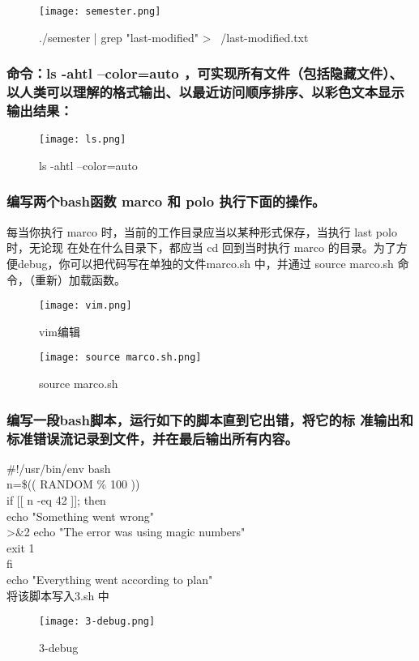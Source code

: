 \documentclass{ctexart}
\begin{document}
\begin{figure}[H]
    \centering
    \texttt{[image: semester.png]}
    \caption{./semester | grep "last-modified" > ~/last-modified.txt}
    \label{fig:enter-label}
\end{figure}


\subsubsection{ 命令：ls -ahtl --color=auto ，可实现所有文件（包括隐藏文件）、以人类可以理解的格式输出、以最近访问顺序排序、以彩色文本显示输出结果：}

\begin{figure}[H]
    \centering
    \texttt{[image: ls.png]}
    \caption{ls -ahtl --color=auto}
    \label{fig:enter-label}
\end{figure}

\subsubsection{编写两个bash函数 marco 和 polo 执行下面的操作。}
每当你执行 marco 时，当前的工作目录应当以某种形式保存，当执行 last polo 时，无论现
在处在什么目录下，都应当 cd 回到当时执行 marco 的目录。为了方便debug，你可以把代码写在单独的文件marco.sh 中，并通过 source marco.sh 命令，（重新）加载函数。
\begin{figure}[H]
    \centering
    \texttt{[image: vim.png]}
    \caption{vim编辑}
    \label{fig:enter-label}
\end{figure}

\begin{figure}[H]
    \centering
    \texttt{[image: source marco.sh.png]}
    \caption{source marco.sh}
    \label{fig:enter-label}
\end{figure}


\subsubsection{编写一段bash脚本，运行如下的脚本直到它出错，将它的标
准输出和标准错误流记录到文件，并在最后输出所有内容。}
\#!/usr/bin/env bash \\
n=\$(( RANDOM \% 100 )) \\
if [[ n -eq 42 ]]; then \\
    echo "Something went wrong" \\
    >&2 echo "The error was using magic numbers" \\
    exit 1\\
fi\\
    echo "Everything went according to plan" \\
将该脚本写入3.sh 中\\
 \begin{figure}[h]
     \centering
     \texttt{[image: 3-debug.png]}
     \caption{3-debug}
     \label{fig:enter-label}
 \end{figure}
 
\end{document}
